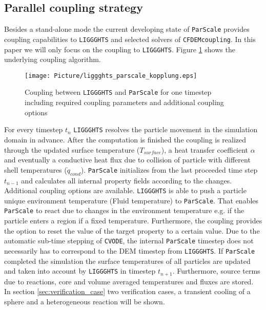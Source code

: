 \documentclass{particles2015}
\begin{document}
\subsection{Parallel coupling strategy}
Besides a stand-alone mode the current developing state of \texttt{ParScale} provides coupling capabilities to \texttt{LIGGGHTS}\textsuperscript{\textregistered}  and selected solvers of \texttt{CFDEMcoupling}. In this paper we will only focus on the coupling to \texttt{LIGGGHTS}\textsuperscript{\textregistered}. Figure \ref{fig:Coupling_parScale_LIGGGHTS} shows the underlying coupling algorithm.

\begin{figure}[h!]
   \centering
   \texttt{[image: Picture/liggghts\_parscale\_kopplung.eps]}
   \caption{Coupling between \texttt{LIGGGHTS}\textsuperscript{\textregistered} and \texttt{ParScale} for one timestep including required coupling parameters and additional coupling options}
   \label{fig:Coupling_parScale_LIGGGHTS}
\end{figure}

For every timestep $t_n$ \texttt{LIGGGHTS}\textsuperscript{\textregistered} resolves the particle movement in the simulation domain in advance. After the computation is finished the coupling is realized through the updated surface temperature ($T_{surface}$), a heat transfer coefficient $\alpha$ and eventually a conductive heat flux due to collision of particle with different shell temperatures ($\dot{q}_{cond}$). \texttt{ParScale} initializes from the last proceeded time step $t_{n-1}$ and calculates all internal property fields according to the changes. Additional coupling options are available. \texttt{LIGGGHTS}\textsuperscript{\textregistered} is able to push a particle unique environment temperature (Fluid temperature) to \texttt{ParScale}. That enables \texttt{ParScale} to react due to changes in the environment temperature e.g. if the particle enters a region if a fixed temperature. Furthermore, the coupling provides the option to reset the value of the target property to a certain value. Due to the automatic sub-time stepping of \texttt{CVODE}, the internal \texttt{ParScale} timestep does not necessarily has to correspond to the DEM timestep from \texttt{LIGGGHTS}\textsuperscript{\textregistered}. If \texttt{ParScale} completed the simulation the surface temperatures of all particles are updated and taken into account by \texttt{LIGGGHTS}\textsuperscript{\textregistered} in timestep $t_{n+1}$. Furthermore, source terms due to reactions, core and volume averaged temperatures and fluxes are stored.\\
In section \ref{sec:verification_case} two verification cases, a transient cooling of a sphere and a heterogeneous reaction will be shown.
\end{document}
